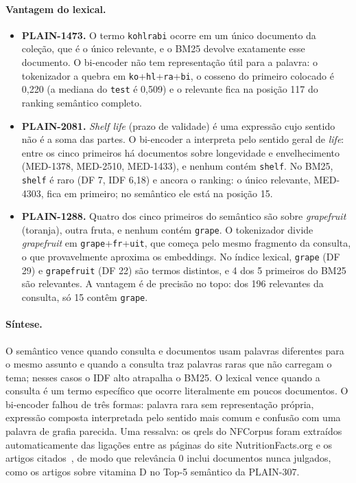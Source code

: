 \documentclass[11pt,a4paper]{article}
\newcommand{\cod}[1]{\texttt{#1}}
\begin{document}
\paragraph{Vantagem do lexical.}
\begin{itemize}
\item \textbf{PLAIN-1473.} O termo \cod{kohlrabi} ocorre em um único documento da coleção, que é o único relevante, e o BM25 devolve exatamente esse documento. O bi-encoder não tem representação útil para a palavra: o tokenizador a quebra em \cod{ko}+\cod{hl}+\cod{ra}+\cod{bi}, o cosseno do primeiro colocado é 0,220 (a mediana do \cod{test} é 0,509) e o relevante fica na posição 117 do ranking semântico completo.
\item \textbf{PLAIN-2081.} \emph{Shelf life} (prazo de validade) é uma expressão cujo sentido não é a soma das partes. O bi-encoder a interpreta pelo sentido geral de \emph{life}: entre os cinco primeiros há documentos sobre longevidade e envelhecimento (MED-1378, MED-2510, MED-1433), e nenhum contém \cod{shelf}. No BM25, \cod{shelf} é raro (DF 7, IDF 6,18) e ancora o ranking: o único relevante, MED-4303, fica em primeiro; no semântico ele está na posição 15.
\item \textbf{PLAIN-1288.} Quatro dos cinco primeiros do semântico são sobre \emph{grapefruit} (toranja), outra fruta, e nenhum contém \cod{grape}. O tokenizador divide \emph{grapefruit} em \cod{grape}+\cod{fr}+\cod{uit}, que começa pelo mesmo fragmento da consulta, o que provavelmente aproxima os embeddings. No índice lexical, \cod{grape} (DF 29) e \cod{grapefruit} (DF 22) são termos distintos, e 4 dos 5 primeiros do BM25 são relevantes. A vantagem é de precisão no topo: dos 196 relevantes da consulta, só 15 contêm \cod{grape}.
\end{itemize}

\paragraph{Síntese.} O semântico vence quando consulta e documentos usam palavras diferentes para o mesmo assunto e quando a consulta traz palavras raras que não carregam o tema; nesses casos o IDF alto atrapalha o BM25. O lexical vence quando a consulta é um termo específico que ocorre literalmente em poucos documentos. O bi-encoder falhou de três formas: palavra rara sem representação própria, expressão composta interpretada pelo sentido mais comum e confusão com uma palavra de grafia parecida. Uma ressalva: os qrels do NFCorpus foram extraídos automaticamente das ligações entre as páginas do site NutritionFacts.org e os artigos citados~\cite{boteva2016}, de modo que relevância 0 inclui documentos nunca julgados, como os artigos sobre vitamina D no Top-5 semântico da PLAIN-307.
\end{document}
